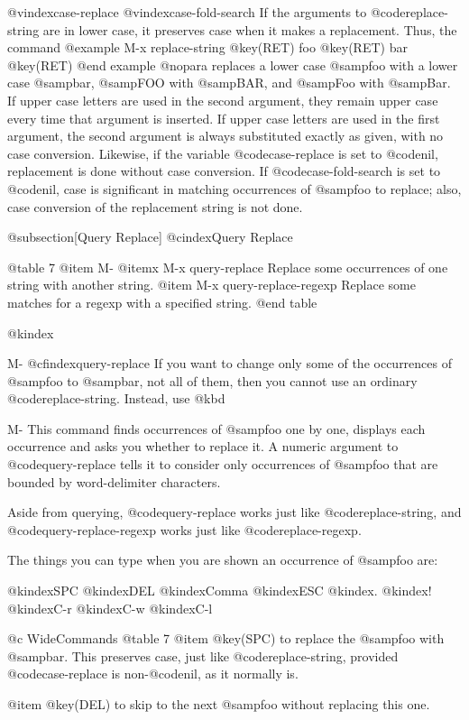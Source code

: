 {{{{{{{{{{{{{{{{@vindex{case-replace}
@vindex{case-fold-search}
  If the arguments to @code{replace-string} are in lower case, it preserves
case when it makes a replacement.  Thus, the command
@example
M-x replace-string @key(RET) foo @key(RET) bar @key(RET)
@end example
@nopara
replaces a lower case @samp{foo} with a lower case @samp{bar}, @samp{FOO}
with @samp{BAR}, and @samp{Foo} with @samp{Bar}.  If upper case letters
are used in the second argument, they remain upper case every time that
argument is inserted.  If upper case letters are used in the first
argument, the second argument is always substituted exactly as given, with
no case conversion.  Likewise, if the variable @code{case-replace} is set
to @code{nil}, replacement is done without case conversion.  If
@code{case-fold-search} is set to @code{nil}, case is significant in
matching occurrences of @samp{foo} to replace; also, case conversion of
the replacement string is not done.

@subsection[Query Replace]
@cindex{Query Replace}

@table 7
@item M-%
@itemx M-x query-replace
Replace some occurrences of one string with another string.
@item M-x query-replace-regexp
Replace some matches for a regexp with a specified string.
@end table

@kindex{M-%
@cfindex{query-replace}
  If you want to change only some of the occurrences of @samp{foo} to
@samp{bar}, not all of them, then you cannot use an ordinary
@code{replace-string}.  Instead, use @kbd{M-%
This command finds occurrences of @samp{foo} one by one, displays each
occurrence and asks you whether to replace it.  A numeric argument to
@code{query-replace} tells it to consider only occurrences of @samp{foo}
that are bounded by word-delimiter characters.

  Aside from querying, @code{query-replace} works just like
@code{replace-string}, and @code{query-replace-regexp} works
just like @code{replace-regexp}.

  The things you can type when you are shown an occurrence of @samp{foo}
are:

@kindex{SPC}
@kindex{DEL}
@kindex{Comma}
@kindex{ESC}
@kindex{.}
@kindex{!}
@kindex{C-r}
@kindex{C-w}
@kindex{C-l}

@c WideCommands
@table 7
@item @key(SPC)
to replace the @samp{foo} with @samp{bar}.  This preserves case, just like
@code{replace-string}, provided @code{case-replace} is non-@code{nil}, 
as it normally is.

@item @key(DEL)
to skip to the next @samp{foo} without replacing this one.

}}}}}}}}}}}}}}}}}}
